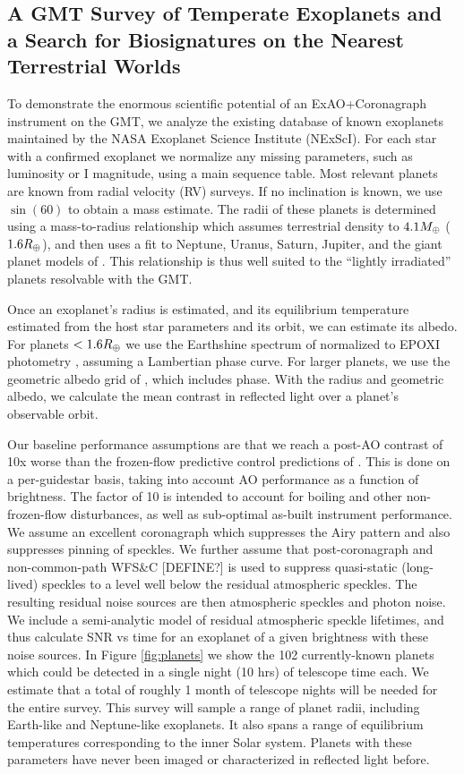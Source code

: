 \documentclass[12pt,preprint]{aastex}
\begin{document}
\subsection{A GMT Survey of Temperate Exoplanets and a Search for Biosignatures on the Nearest Terrestrial Worlds}

To demonstrate the enormous scientific potential of an ExAO+Coronagraph instrument on the GMT, we analyze the existing database of known exoplanets maintained by the NASA Exoplanet Science Institute (NExScI).  For each star with a confirmed exoplanet we normalize any missing parameters, such as luminosity or I magnitude, using a main sequence table.  Most relevant planets are known from radial velocity (RV) surveys.  If no inclination is known, we use $\sin(60)$ to obtain a mass estimate.  The radii of these planets is determined using a mass-to-radius relationship which assumes terrestrial density to $4.1 M_\oplus$ ($1.6 R_\oplus$), and then uses a fit to Neptune, Uranus, Saturn, Jupiter, and the giant planet models of \citet{2007ApJ...659.1661F}.  This relationship is thus well suited to the “lightly irradiated” planets resolvable with the GMT.

Once an exoplanet’s radius is estimated, and its equilibrium temperature estimated from the host star parameters and its orbit, we can estimate its albedo.  For planets $< 1.6 R_\oplus$ we use the Earthshine spectrum of \citet{2006ApJ...644..551T} normalized to EPOXI photometry \citep{2013ApJ...765L..17C}, assuming a Lambertian phase curve. For larger planets, we use the geometric albedo grid of \citet{2010ApJ...724..189C}, which includes phase.  With the radius and geometric albedo, we calculate the mean contrast in reflected light over a planet’s observable orbit.	

Our baseline performance assumptions are that we reach a post-AO contrast of 10x worse than the frozen-flow predictive control predictions of \citet{2018JATIS...4a9001M}.  This is done on a per-guidestar basis, taking into account AO performance as a function of brightness.  The factor of 10 is intended to account for boiling and other non-frozen-flow disturbances, as well as sub-optimal as-built instrument performance. We assume an excellent coronagraph which suppresses the Airy pattern and also suppresses pinning of speckles.   We further assume that post-coronagraph and non-common-path WFS\&C [DEFINE?] is used to suppress quasi-static (long-lived) speckles to a level well below the residual atmospheric speckles.  The resulting residual noise sources are then atmospheric speckles and photon noise.  We include a semi-analytic model of residual atmospheric speckle lifetimes, and thus calculate SNR vs time for an exoplanet of a given brightness with these noise sources.
In Figure \ref{fig:planets} we show the 102 currently-known planets which could be detected in a single night (10 hrs) of telescope time each.  We estimate that a total of roughly 1 month of telescope nights will be needed for the entire survey.  This survey will sample a range of planet radii, including Earth-like and Neptune-like exoplanets.  It also spans a range of equilibrium temperatures corresponding to the inner Solar system.  Planets with these parameters have never been imaged or characterized in reflected light before.
\end{document}

